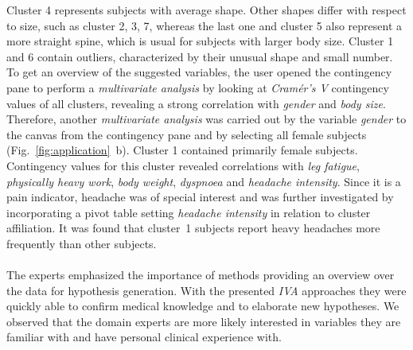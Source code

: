 \documentclass[journal]{style/vgtc} 			          %
\newcommand{\add}[1]{\textcolor{blue}{\uline{#1}}}
\newcommand{\com}[1]{\textcolor{orange}{\uline{#1}}}
\begin{document}
Cluster 4 represents subjects with average shape.
%
Other shapes differ with respect to size, such as cluster 2, 3, 7, whereas the last one and cluster 5 also represent a more straight spine, which is usual for subjects with larger body size.
%
Cluster 1 and 6 contain outliers, characterized by their unusual shape and small number.
%
%
To get an overview of the suggested variables, the user opened the contingency pane to perform a \emph{multivariate analysis} by looking at \emph{Cram\'{e}r's V} contingency values of all clusters, revealing a strong correlation with \emph{gender} and \emph{body size}.
%
Therefore, another \emph{multivariate analysis} was carried out by the variable \emph{gender} to the canvas from the contingency pane and by selecting all female subjects (Fig.~\ref{fig:application}~b).
%
Cluster 1 contained primarily female subjects.
%
Contingency values for this cluster revealed correlations with \emph{leg fatigue}, \emph{physically heavy work}, \emph{body weight}, \emph{dyspnoea} and \emph{headache intensity}.
%
%
Since it is a pain indicator, headache was of special interest and was further investigated by incorporating a pivot table setting \emph{headache intensity} in relation to cluster affiliation.
%
It was found that cluster~1 subjects report heavy headaches more frequently than other subjects.
%
%
%
%
\\\\
The experts emphasized the importance of methods providing an overview over the data for hypothesis generation.
%
With the presented \emph{IVA} approaches they were quickly able to confirm medical knowledge and to elaborate new hypotheses.
%
We observed that the domain experts are more likely interested in variables they are familiar with and have personal clinical experience with.
\end{document}
